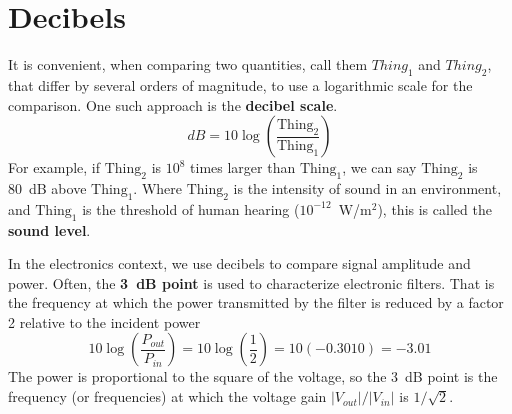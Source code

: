 \documentclass[11pt]{article}
\begin{document}
\section{Decibels}
\label{sec:dB}

It is convenient, when comparing two quantities, call them $Thing_1$ 
and $Thing_2$, that differ by several orders of magnitude, to use a
logarithmic scale for the comparison. One such approach is the
\textbf{decibel scale}.
\begin{equation}
  dB = 10 \log \left( \frac{\mathrm{Thing_2}}{\mathrm{Thing_1}} \right)
  \label{eq:db}
\end{equation}
For example, if $\mathrm{Thing_2}$ is $10^8$ times larger than
$\mathrm{Thing_1}$, we can say $\mathrm{Thing_2}$ is 80~dB above
$\mathrm{Thing_1}$. Where $\mathrm{Thing_2}$ is the intensity
of sound in an environment, and $\mathrm{Thing_1}$ is the threshold of
human hearing ($10^{-12}$~W/m$^2$), this is called the
\textbf{sound level}.

In the electronics context, we use decibels to compare signal
amplitude and power. Often, the \textbf{3~dB point} is used to characterize 
electronic filters. That is the frequency at which the power
transmitted by the filter is reduced by a factor 2 relative to the
incident power 
\[
10 \log \left( \frac{P_{out}}{P_{in}} \right)
= 10 \log \left( \frac{1}{2} \right) = 10 (-0.3010) = -3.01
\]
The power is proportional to the square of the voltage, so the 3~dB
point is the frequency (or frequencies) at which the voltage gain
$|V_{out}|/|V_{in}|$ is $1/\sqrt{2}$. 




\end{document}
